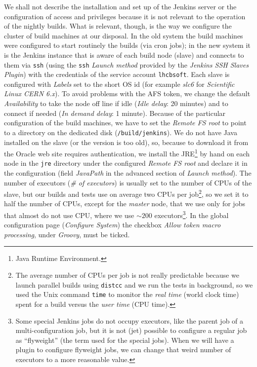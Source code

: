 We shall not describe the installation and set up of the Jenkins server or the
configuration of access and privileges because it is not relevant to the
operation of the nightly builds.  What is relevant, though, is the way we
configure the cluster of build machines at our disposal.  In the old system the
build machines were configured to start routinely the builds (via cron jobs); in
the new system it is the Jenkins instance that is aware of each build node
(slave) and connects to them via \texttt{ssh} (using the \texttt{ssh}
\emph{Launch method} provided by the \emph{Jenkins SSH Slaves Plugin}) with the
credentials of the service account \texttt{lhcbsoft}.  Each slave is configured
with \emph{Labels} set to the short OS id (for example \emph{slc6} for
\emph{Scientific Linux CERN 6.x}). To avoid problems with the AFS token, we
change the default \emph{Availability} to take the node off line if idle
(\emph{Idle delay}: 20 minutes) and to connect if needed (\emph{In demand
delay}: 1 minute).  Because of the particular configuration of the build
machines, we have to set the \emph{Remote FS root} to point to a directory on
the dedicated disk (\texttt{/build/jenkins}).  We do not have Java installed on
the slave (or the version is too old), so, because to download it from the
Oracle web site requires authentication, we install the JRE\footnote{Java
Runtime Environment\cite{JRE}.} by hand on each node in the \texttt{jre}
directory under the configured \emph{Remote FS root} and declare it in the
configuration (field \emph{JavaPath} in the advanced section of \emph{Launch
method}).  The number of executors (\emph{\# of executors}) is usually set to
the number of CPUs of the slave, but our builds and tests use on average two
CPUs
per job\footnote{The average number of CPUs per job is not
  really predictable because we launch parallel builds using
  \texttt{distcc}\cite{distcc,distccCERN} and we run the tests in background, so
  we used the Unix command \texttt{time} to monitor the \emph{real time} (world
  clock time) spent for a build versus the \emph{user time} (CPU time).},
so we set it to half the number of CPUs, except for the \emph{master} node, that
we use only for jobs that almost do not use CPU, where we use $\sim200$
executors\footnote{Some special Jenkins jobs do not occupy executors, like the
parent job of a multi-configuration job, but it is not (jet) possible to
configure a regular job as ``flyweight'' (the term used for the special jobs).
When we will have a plugin to configure flyweight jobs, we can change that weird
number of executors to a more reasonable value.}.  In the global configuration
page (\emph{Configure System}) the checkbox \emph{Allow token macro processing},
under \emph{Groovy}, must be ticked.

